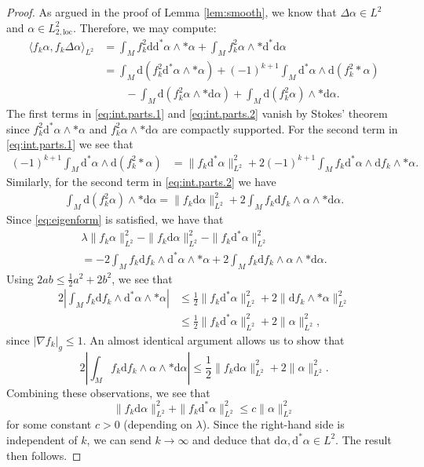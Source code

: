 \documentclass{article}
\theoremstyle{definition}
\numberwithin{thm}{section}
\numberwithin{equation}{section}
\def\d{\mathrm{d}}
\begin{document}
\begin{proof}
As argued in the proof of Lemma \ref{lem:smooth}, we know that $\Delta\alpha\in L^2$ and $\alpha\in L^2_{2,\text{loc}}$.  
Therefore, we may compute:
\begin{align}
    \langle f_k\alpha,f_k\Delta\alpha\rangle_{L^2}&=\int_M f_k^2\d\d^*\alpha\wedge*\alpha +\int_Mf_k^2\alpha\wedge *\d^*\d\alpha\\
    &=\int_M\d(f_k^2\d^*\alpha\wedge*\alpha)+(-1)^{k+1}\int_M \d^*\alpha\wedge \d(f_k^2*\alpha)\label{eq:int.parts.1}\\
    &\qquad-\int_M \d(f_k^2\alpha\wedge *\d\alpha)+\int_M\d(f_k^2\alpha)\wedge *\d\alpha.\label{eq:int.parts.2}
\end{align}
The first terms in \eqref{eq:int.parts.1} and \eqref{eq:int.parts.2} vanish by Stokes' theorem since $f_k^2\d^*\alpha\wedge *\alpha$ and $f_k^2\alpha\wedge *\d\alpha$ are compactly supported.  For the second term in \eqref{eq:int.parts.1} we see that
\begin{align}
 (-1)^{k+1}\int_M \d^*\alpha\wedge \d(f_k^2*\alpha)&=\|f_k\d^*\alpha\|_{L^2}^2+2(-1)^{k+1}\int_Mf_k\d^*\alpha\wedge\d  f_k\wedge *\alpha.
\end{align}
 Similarly, for the second term in \eqref{eq:int.parts.2} we have
 \begin{align}
     \int_M\d(f_k^2\alpha)\wedge *\d\alpha=\|f_k\d\alpha\|_{L^2}^2+2\int_Mf_k\d f_k\wedge\alpha\wedge *\d\alpha.
 \end{align}
Since \eqref{eq:eigenform} is satisfied, we have that
\begin{multline}
    \lambda\|f_k\alpha\|_{L^2}^2-\|f_k\d\alpha\|_{L^2}^2-\|f_k\d^*\alpha\|_{L^2}^2\\
    =-2\int_M f_k\d f_k\wedge \d^*\alpha\wedge *\alpha +2\int_M f_k \d f_k\wedge \alpha\wedge *\d\alpha.
\end{multline}
Using $2ab\leq \frac{1}{2}a^2+2b^2$, we see that
\begin{align}
    2\left|\int_M  f_k\d f_k\wedge \d^*\alpha\wedge *\alpha\right|&\leq \frac{1}{2}\|f_k\d^*\alpha\|_{L^2}^2+2\|\d f_k\wedge *\alpha\|_{L^2}^2\\
    & \leq \frac{1}{2}\|f_k\d^*\alpha\|_{L^2}^2+2\|\alpha\|_{L^2}^2,
\end{align}
since $|\nabla f_k|_g\leq 1$.  An almost identical argument allows us to show that
\begin{equation}
2\left|\int_M f_k \d f_k\wedge \alpha\wedge *\d\alpha\right|\leq \frac{1}{2}\|f_k\d\alpha\|^2_{L^2}+2\|\alpha\|_{L^2}^2.
\end{equation}
Combining these observations, we see that
\begin{equation}
    \|f_k\d\alpha\|_{L^2}^2+\|f_k\d^*\alpha\|_{L^2}^2\leq c\|\alpha\|_{L^2}^2
\end{equation}
for some constant $c>0$ (depending on $\lambda$).  Since the right-hand side is independent of $k$, we can send $k\to \infty$ and deduce that $\d\alpha,\d^*\alpha\in L^2$.  
The result then follows.
\end{proof}
\end{document}
